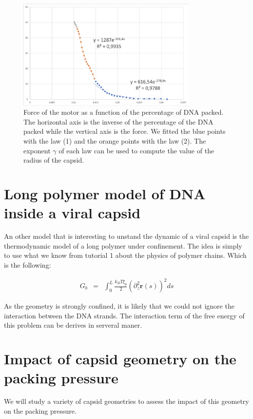 \documentclass{article}
\begin{document}
\begin{figure}[H]
    \centering
    \includegraphics[width=0.8\textwidth]{Fig_Exponents.png}
    \caption{Force of the motor as a function of the percentage of DNA packed. The horizontal axis is the inverse of the percentage of the DNA packed while the vertical axis is the force. We fitted the blue points with the law (1) and the orange points with the law (2). The exponent $\gamma$ of each law can be used to compute the value of the radius of the capsid.}
    \label{fig:force}
\end{figure}

\section{Long polymer model of DNA inside a viral capsid}
An other model that is interesting to unstand the dynamic of a viral capsid is the thermodynamic model of a long polymer under confinement. The idea is simply to use what we know from tutorial 1 about the physics of polymer chains. Which is the following:

\begin{eqnarray}
    G_b & = & \int_{0}^{L} \frac{k_B T \xi_p}{2} \left( \partial_z^2 \mathbf{r}(s) \right)^2 ds
\end{eqnarray}

As the geometry is strongly confined, it is likely that we could not ignore the interaction between the DNA strands. The interaction term of the free energy of this problem can be derives in serveral maner.

\section{Impact of capsid geometry on the packing pressure}

We will study a variety of capsid geometries to assess the impact of this geometry on the packing pressure.
\end{document}
